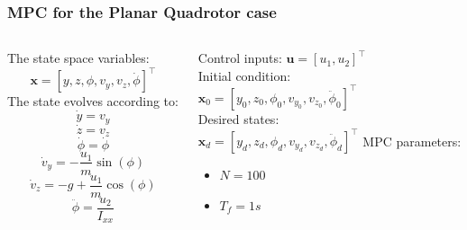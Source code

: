 \documentclass{thesisbeamer}
\begin{document}
\begin{frame}
	\frametitle{MPC for the Planar Quadrotor case}
	
    \begin{columns}
        \begin{column}{0.5\textwidth}
            The state space variables:
            \begin{equation}
                \bm{x} = [y, z, \phi, v_y, v_z, \dot{\phi}]^{\intercal}
            \end{equation}
            The state evolves according to: 
            \begin{equation}
                \dot{y} = v_y
            \end{equation}
            \begin{equation}
                \dot{z} = v_z
            \end{equation}
            \begin{equation}
                \dot{\phi} = \dot{\phi}
            \end{equation}
            \begin{equation}
                \dot{v}_y = - \frac{u_1}{m} \sin(\phi)
            \end{equation}
            \begin{equation}
                \dot{v}_z = - g + \frac{u_1}{m} \cos(\phi)
            \end{equation}
            \begin{equation}
                \ddot{\phi} = \frac{u_2}{I_{xx}}
            \end{equation}   
        \end{column}
        \begin{column}{0.5\textwidth}
            Control inputs:
            $\bm{u} = [u_1, u_2]^{\intercal}$\\
            Initial condition: \\
            $\bm{x}_0 = [ y_0, z_0, \phi_0, v_{y_0}, v_{z_0}, \ddot{\phi}_0]^{\intercal}$\\
            \vfill
            Desired states: \\
            $\bm{x}_d = [y_d,z_d,\phi_d, v_{y_d},v_{z_d},\ddot{\phi}_d]^{\intercal}$
            \vfill
            MPC parameters: 
            \begin{itemize}
                \item $N = 100$
                \item $T_f = 1s$

\end{itemize}
\end{column}
\end{columns}
\end{frame}
\end{document}
